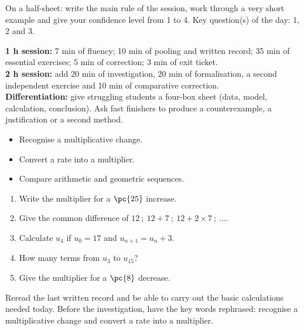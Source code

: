 \begin{exitticket}[3 minutes]On a half-sheet: write the main rule of the session, work through a very short example and give your confidence level from 1 to 4. Key question(s) of the day: 1, 2 and 3.\end{exitticket}

\ifmxteacher
\begin{method}
\textbf{1 h session:} 7 min of fluency; 10 min of pooling and written record; 35 min of essential exercises; 5 min of correction; 3 min of exit ticket.\\
    \textbf{2 h session:} add 20 min of investigation, 20 min of formalisation, a second independent exercise and 10 min of comparative correction.\\
    \textbf{Differentiation:} give struggling students a four-box sheet (data, model, calculation, conclusion). Ask fast finishers to produce a counterexample, a justification or a second method.
\end{method}
\fi
{}
    \begin{objectives}\begin{itemize}\item Recognise a multiplicative change.\item Convert a rate into a multiplier.\item Compare arithmetic and geometric sequences.\end{itemize}\end{objectives}
    \begin{fluency}\begin{enumerate}\item Write the multiplier for a $\pc{25}$ increase. \item Give the common difference of $12\ ;\ 12+7\ ;\ 12+2\times7\ ;\ \ldots$. \item Calculate $u_4$ if $u_0=17$ and $u_{n+1}=u_n+3$. \item How many terms from $u_3$ to $u_{15}$? \item Give the multiplier for a $\pc{8}$ decrease. \end{enumerate}\end{fluency}
    \begin{prerequisites}Reread the last written record and be able to carry out the basic calculations needed today. Before the investigation, have the key words rephrased: recognise a multiplicative change and convert a rate into a multiplier.\end{prerequisites}

